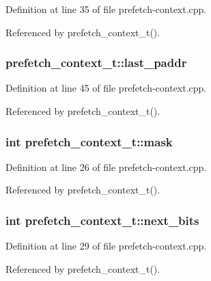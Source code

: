 Definition at line 35 of file prefetch-context.cpp.

Referenced by prefetch\_\-context\_\-t().
\subsubsection[{last\_\-paddr}]{ {\bf prefetch\_\-context\_\-t::last\_\-paddr}\hspace{0.3cm}{\tt  [protected]}}\label{classprefetch__context__t_cd0c9105eec8027fc27bd283c7d64953}




Definition at line 45 of file prefetch-context.cpp.

Referenced by prefetch\_\-context\_\-t().
\subsubsection[{mask}]{\setlength{\rightskip}{0pt plus 5cm}int {\bf prefetch\_\-context\_\-t::mask}\hspace{0.3cm}{\tt  [protected]}}\label{classprefetch__context__t_9b6c85cc052324ac0cec9083ae56a9c9}




Definition at line 26 of file prefetch-context.cpp.

Referenced by prefetch\_\-context\_\-t().
\subsubsection[{next\_\-bits}]{\setlength{\rightskip}{0pt plus 5cm}int {\bf prefetch\_\-context\_\-t::next\_\-bits}\hspace{0.3cm}{\tt  [protected]}}\label{classprefetch__context__t_bf51d0aad1f7cf1a844c307ddc2f5681}




Definition at line 29 of file prefetch-context.cpp.

Referenced by prefetch\_\-context\_\-t().
